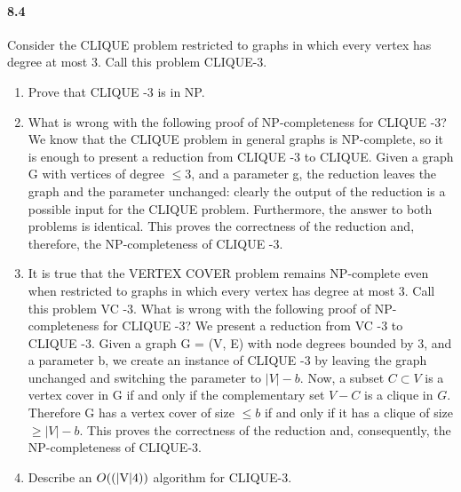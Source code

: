 \documentclass[12pt]{article}
\newcommand{\BigO}[1]{\ensuremath{O(#1)}}
\begin{document}
\paragraph{8.4}
Consider the CLIQUE problem restricted to graphs in which every vertex has degree at most 3.
Call this problem CLIQUE-3.
\begin{enumerate}
\item Prove that CLIQUE -3 is in NP.
\item What is wrong with the following proof of NP-completeness for CLIQUE -3?
        We know that the CLIQUE problem in general graphs is NP-complete, so it is enough to
        present a reduction from CLIQUE -3 to CLIQUE. Given a graph G with
        vertices of degree $\le 3$, and a parameter g, the reduction
        leaves the graph and the parameter unchanged: clearly the output
        of the reduction is a possible input for the CLIQUE problem.
        Furthermore, the answer to both problems is identical. This
        proves the correctness of the reduction and, therefore, the
        NP-completeness of CLIQUE -3.
\item It is true that the VERTEX COVER problem remains NP-complete even when restricted to
    graphs in which every vertex has degree at most 3. Call this problem
    VC -3. What is wrong with the following proof of NP-completeness for
    CLIQUE -3?  We present a reduction from VC -3 to CLIQUE -3. Given a
    graph G = (V, E) with node degrees bounded by 3, and a parameter b,
    we create an instance of CLIQUE -3 by leaving the graph unchanged
    and switching the parameter to $|V| - b$. Now, a subset $C \subset
    V$ is a vertex cover in G if and only if the complementary set $V -
    C$ is a clique in $G$. Therefore G has a vertex cover of size $\le
    b$ if and only if it has a clique of size $\ge |V| - b$. This proves
    the correctness of the reduction and, consequently, the
    NP-completeness of CLIQUE-3.
\item Describe an \BigO{$(|V|4)$} algorithm for CLIQUE-3.
\end{enumerate}
\end{document}
